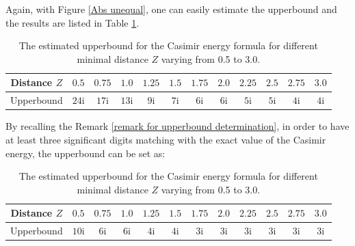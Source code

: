Again, with Figure \ref{Abs unequal}, one can easily estimate the upperbound and the results are listed in Table \ref{Unequal: distance and upperbound}.
\begin{table}[H]
    \centering
    \begin{tabular}{ |c|c|c|c|c|c|c|c|c|c|c|c| }
        \hline
        Distance $Z$ & $ 0.5$ & $ 0.75$  & $ 1.0$ & $1.25$ & $ 1.5$ & $1.75$  & $2.0$ & $2.25$ & $ 2.5$ & $ 2.75$  & $3.0$ \\\hline
        Upperbound & $24\mathrm{i}$ & $17\mathrm{i}$ & $13\mathrm{i}$ & $9\mathrm{i}$ & $7\mathrm{i}$ & $6\mathrm{i}$ & $6\mathrm{i}$ & $5\mathrm{i}$ & $5\mathrm{i}$ & $4\mathrm{i}$ & $4\mathrm{i}$ \\\hline
       \end{tabular}
       \caption{\label{Unequal: distance and upperbound} The estimated upperbound for the Casimir energy formula for different minimal distance $Z$ varying from 
       0.5 to 3.0.}
\end{table}

By recalling the Remark \ref{remark for upperbound determination}, in order to have at least three significant digits matching with the exact value of the Casimir
energy, the upperbound can be set as:
\begin{table}[H]
    \centering
    \begin{tabular}{ |c|c|c|c|c|c|c|c|c|c|c|c| }
        \hline
        Distance $Z$ & $ 0.5$ & $ 0.75$  & $ 1.0$ & $1.25$ & $ 1.5$ & $1.75$  & $2.0$ & $2.25$ & $ 2.5$ & $ 2.75$  & $3.0$ \\\hline
        Upperbound & $10\mathrm{i}$ & $6\mathrm{i}$ & $6\mathrm{i}$ & $4\mathrm{i}$ & $4\mathrm{i}$ & $3\mathrm{i}$ & $3\mathrm{i}$ & $3\mathrm{i}$ & $3\mathrm{i}$ & $3\mathrm{i}$ & $3\mathrm{i}$ \\\hline
       \end{tabular}
       \caption{\label{Unqual: distance and upperbound error tolerance} The estimated upperbound for the Casimir energy formula for different minimal distance $Z$ varying from 
       0.5 to 3.0.}
\end{table}


